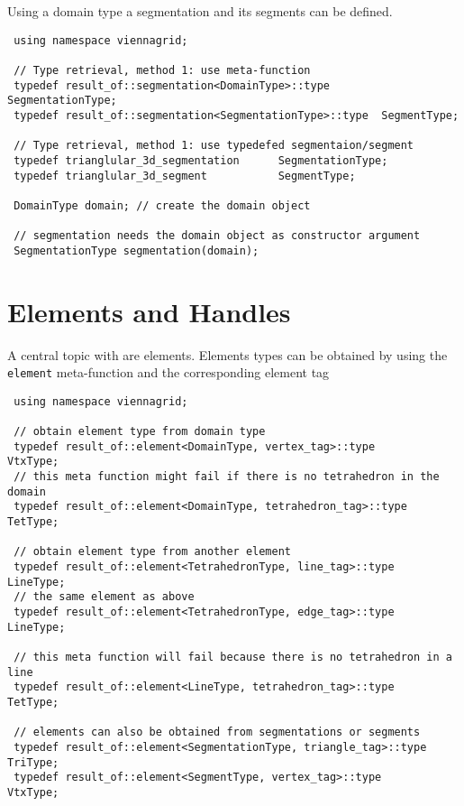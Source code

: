 Using a domain type a segmentation and its segments can be defined.

\begin{lstlisting}
 using namespace viennagrid;
 
 // Type retrieval, method 1: use meta-function
 typedef result_of::segmentation<DomainType>::type        SegmentationType;
 typedef result_of::segmentation<SegmentationType>::type  SegmentType;
 
 // Type retrieval, method 1: use typedefed segmentaion/segment
 typedef trianglular_3d_segmentation      SegmentationType;
 typedef trianglular_3d_segment           SegmentType;

 DomainType domain; // create the domain object
 
 // segmentation needs the domain object as constructor argument
 SegmentationType segmentation(domain);
\end{lstlisting}

\pagebreak

\section{Elements and Handles} \label{sec:elements-and-handles}

A central topic with {\ViennaGrid} are elements. Elements types can be obtained by using the \lstinline|element| meta-function and the corresponding element tag

\begin{lstlisting}
 using namespace viennagrid;
 
 // obtain element type from domain type
 typedef result_of::element<DomainType, vertex_tag>::type         VtxType;
 // this meta function might fail if there is no tetrahedron in the domain
 typedef result_of::element<DomainType, tetrahedron_tag>::type    TetType;
 
 // obtain element type from another element
 typedef result_of::element<TetrahedronType, line_tag>::type      LineType;
 // the same element as above
 typedef result_of::element<TetrahedronType, edge_tag>::type      LineType;
 
 // this meta function will fail because there is no tetrahedron in a line
 typedef result_of::element<LineType, tetrahedron_tag>::type      TetType;
 
 // elements can also be obtained from segmentations or segments
 typedef result_of::element<SegmentationType, triangle_tag>::type TriType;
 typedef result_of::element<SegmentType, vertex_tag>::type        VtxType;
\end{lstlisting}

